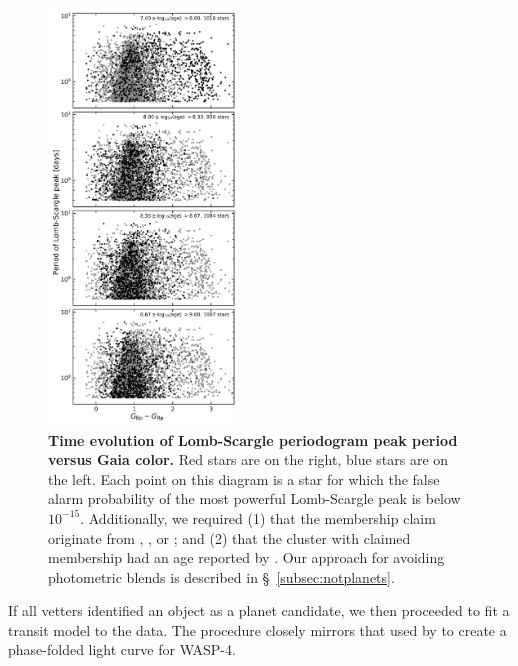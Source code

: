 \documentclass[12pt,twocolumn,tighten]{aastex62}
\begin{document}
\begin{figure}[!t]
	\begin{center}
		\leavevmode
		\includegraphics[width=0.45\textwidth]{LS_period_vs_color_and_age.png}
	\end{center}
	\vspace{-0.2cm}
	\caption{
		{\bf Time evolution of Lomb-Scargle periodogram peak period versus
			Gaia color.}
		Red stars are on the right, blue stars are on the left.
		Each point on this diagram is a star for which the false alarm
		probability of the most powerful Lomb-Scargle peak is below
		$10^{-15}$.
		Additionally, we required (1) that the membership claim originate
		from \citet{cantat-gaudin_gaia_2018},
		\citet{Kharchenko_et_al_2013}, or \citet{gaia_hr_2018}; and (2)
		that the cluster with claimed membership had an age reported by
		\citet{Kharchenko_et_al_2013}.
		Our approach for avoiding photometric blends is described in
		\S~\ref{subsec:notplanets}.
		\label{fig:ls_peak_vs_time}
	}
\end{figure}


If all vetters identified an object as a planet candidate, we then
proceeded to fit a transit model to the data.  The procedure closely
mirrors that used by \citet{bouma_wasp-4b_2019} to create a
phase-folded light curve for WASP-4.
\end{document}
